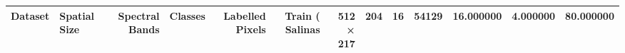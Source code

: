 \begin{tabular}{llrrrrrr}
\toprule
Dataset & Spatial Size & Spectral Bands & Classes & Labelled Pixels & Train (%
\midrule
Salinas & 512 × 217 & 204 & 16 & 54129 & 16.000000 & 4.000000 & 80.000000 \\
\bottomrule
\end{tabular}

